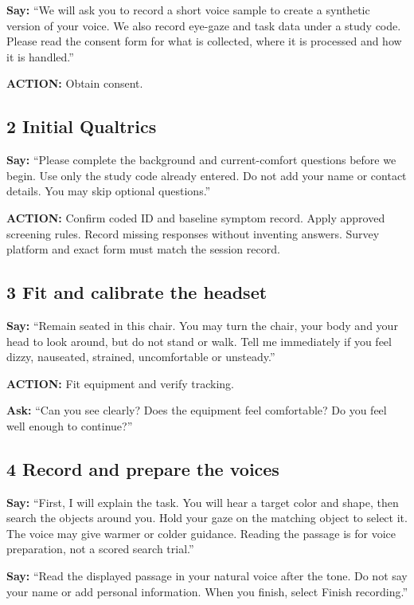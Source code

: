 \textbf{Say:} ``We will ask you to record a short voice sample to create a
synthetic version of your voice. We also record eye-gaze and task data
under a study code. Please read the consent form for what is collected,
where it is processed and how it is handled.''

\textbf{ACTION:} Obtain consent.

\subsection{2 Initial Qualtrics}\label{initial-qualtrics}

\textbf{Say:} ``Please complete the background and current-comfort questions
before we begin. Use only the study code already entered. Do not add
your name or contact details. You may skip optional questions.''

\textbf{ACTION:} Confirm coded ID and baseline symptom record. Apply approved
screening rules. Record missing responses without inventing answers.
Survey platform and exact form must match the session record.

\subsection{3 Fit and calibrate the
headset}\label{fit-and-calibrate-the-headset}

\textbf{Say:} ``Remain seated in this chair. You may turn the chair, your body
and your head to look around, but do not stand or walk. Tell me
immediately if you feel dizzy, nauseated, strained, uncomfortable or
unsteady.''

\textbf{ACTION:} Fit equipment and verify tracking.

\textbf{Ask:} ``Can you see clearly? Does the equipment feel comfortable? Do you
feel well enough to continue?''

\subsection{4 Record and prepare the
voices}\label{record-and-prepare-the-voices}

\textbf{Say:} ``First, I will explain the task. You will hear a target color and
shape, then search the objects around you. Hold your gaze on the
matching object to select it. The voice may give warmer or colder
guidance. Reading the passage is for voice preparation, not a scored
search trial.''

\textbf{Say:} ``Read the displayed passage in your natural voice after the tone.
Do not say your name or add personal information. When you finish,
select Finish recording.''

